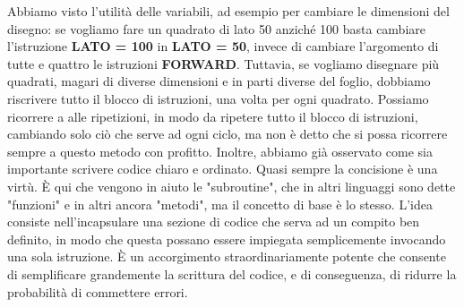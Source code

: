 \vskip 1cm

Abbiamo visto l'utilità delle variabili, ad esempio per cambiare le dimensioni del disegno: se vogliamo fare un quadrato di lato 50 anziché 100 basta cambiare l'istruzione \textbf{LATO = 100} in \textbf{LATO = 50}, invece di cambiare l'argomento di tutte e quattro le istruzioni \textbf{FORWARD}. Tuttavia, se vogliamo disegnare più quadrati, magari di diverse dimensioni e in parti diverse del foglio, dobbiamo riscrivere tutto il blocco di istruzioni, una volta per ogni quadrato. Possiamo ricorrere a alle ripetizioni, in modo da ripetere tutto il blocco di istruzioni, cambiando solo ciò che serve ad ogni ciclo, ma non è detto che si possa ricorrere sempre a questo metodo con profitto. Inoltre, abbiamo già osservato come sia importante scrivere codice chiaro e ordinato. Quasi sempre la concisione è una virtù.  È qui che vengono in aiuto le "subroutine", che in altri linguaggi sono dette "funzioni" e in altri ancora "metodi", ma il concetto di base è lo stesso. L'idea consiste nell'incapsulare una sezione di codice che serva ad un compito ben definito, in modo che questa possano essere impiegata semplicemente invocando una sola istruzione. È un accorgimento straordinariamente potente che consente di semplificare grandemente la scrittura del codice, e di conseguenza, di ridurre la probabilità di commettere errori. 

\vskip 0.5cm

